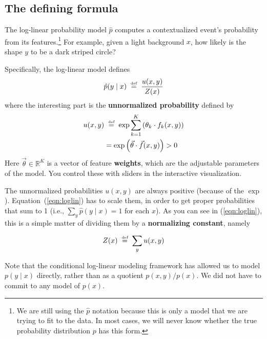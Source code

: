 \documentclass[11pt]{article}
\newcommand{\defeq}{\;\stackrel{\mbox{\tiny def}}{=}\;}
\newcommand{\vtheta}{\vec{\theta}}
\newcommand{\ph}{\hat{p}}
\newcommand{\Real}{{\mathbb R}}
\begin{document}
\subsection{The defining formula}\label{sec:formula}


The log-linear probability model $\ph$ computes a contextualized
event's probability from its features.\footnote{We are still using the
  $\ph$ notation because this is only a model that we are trying to
  fit to the data.  In most cases, we will never know whether the true
  probability distribution $p$ has this form.}  For example, given a
light background $x$, how likely is the shape $y$ to be a dark striped circle?

Specifically, the log-linear model defines
\begin{equation}\label{eqn:loglin}
  \ph(y \mid x) \defeq \frac{u(x,y)}{Z(x)}
\end{equation}
where the interesting part is the {\bf unnormalized probability}
defined by
\begin{align}\label{eqn:unnorm}
  u(x,y) &\defeq \exp \sum_{k=1}^K \left( \theta_k \cdot f_k(x,y) \right)  \\
         &= \exp \left(\vtheta \cdot \vec{f}(x,y)\right) > 0
\end{align}
Here $\vtheta \in \Real^K$ is a vector of feature {\bf weights}, which
are the adjustable parameters of the model.  You control these
with sliders in the interactive visualization.

\medskip
The unnormalized probabilities $u(x,y)$ are always positive (because
of the $\exp$).  Equation~(\ref{eqn:loglin}) has to scale them, in
order to get proper probabilities that sum to 1 (i.e., $\sum_y
\ph(y\mid x) = 1$ for each $x$).  As you can see in
(\ref{eqn:loglin}), this is a simple matter of dividing them by a {\bf
  normalizing constant}, namely

\vspace{-16pt}
\begin{equation}
  Z(x) \defeq \sum_y u(x,y)
\end{equation}

Note that the conditional log-linear modeling framework has allowed us
to model $p(y \mid x)$ directly, rather than as a quotient $p(x,y) /
p(x)$.  We did not have to commit to any model of $p(x)$.
\end{document}

